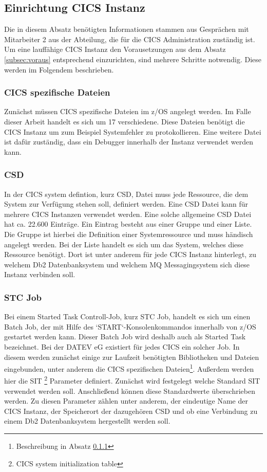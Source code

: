 \subsection{Einrichtung CICS Instanz}\label{subsec:createCICS}
Die in diesem Absatz benötigten Informationen stammen aus Gesprächen mit Mitarbeiter 2 aus der Abteilung, die für die CICS Administration zuständig ist.
Um eine lauffähige CICS Instanz den Vorausetzungen aus dem Absatz \ref{subsec:voraus} entsprechend einzurichten, sind mehrere Schritte notwendig.
Diese werden im Folgendem beschrieben.

\subsubsection{CICS spezifische Dateien}\label{sssec:speziDat}
Zunächst müssen CICS spezifische Dateien im z/OS angelegt werden.
Im Falle dieser Arbeit handelt es sich um 17 verschiedene.
Diese Dateien benötigt die CICS Instanz um zum Beispiel Systemfehler zu protokollieren.
Eine weitere Datei ist dafür zuständig, dass ein Debugger innerhalb der Instanz verwendet werden kann.

\subsubsection{CSD}
In der CICS system defintion, kurz CSD, Datei muss jede Ressource, die dem System zur Verfügung stehen soll, definiert werden.
Eine CSD Datei kann für mehrere CICS Instanzen verwendet werden.
Eine solche allgemeine CSD Datei hat ca. 22.600 Einträge.
Ein Eintrag besteht aus einer Gruppe und einer Liste.
Die Gruppe ist hierbei die Definition einer Systemressource und muss händisch angelegt werden.
Bei der Liste handelt es sich um das System, welches diese Ressource benötigt.
Dort ist unter anderem für jede CICS Instanz hinterlegt, zu welchem Db2 Datenbanksystem und welchem MQ Messagingsystem sich diese Instanz verbinden soll.

\subsubsection{STC Job}
Bei einem Started Task Controll-Job, kurz STC Job, handelt es sich um einen Batch Job, der mit Hilfe des `START`-Konsolenkommandos innerhalb von z/OS gestartet werden kann.
Dieser Batch Job wird deshalb auch als Started Task bezeichnet.\cite{Cassier.2007}
Bei der DATEV eG existiert für jedes CICS ein solcher Job.
In diesem werden zunächst einige zur Laufzeit benötigten Bibliotheken und Dateien eingebunden, unter anderem die CICS spezifischen Dateien\footnote{Beschreibung in Absatz \ref{sssec:speziDat}}.
Außerdem werden hier die SIT \footnote{CICS system initialization table} Parameter definiert.
Zunächst wird festgelegt welche Standard SIT verwendet werden soll.
Anschließend können diese Standardwerte überschrieben werden.
Zu diesen Parameter zählen unter anderem, der eindeutige Name der CICS Instanz, der Speicherort der dazugehören CSD und ob eine Verbindung zu einem Db2 Datenbanksystem hergestellt werden soll.

